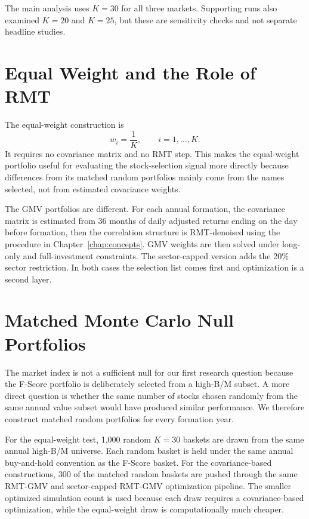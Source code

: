 \documentclass[11pt,a4paper]{report}
\numberwithin{figure}{chapter}
\numberwithin{table}{chapter}
\numberwithin{equation}{chapter}
\begin{document}
The main analysis uses $K=30$ for all three markets. Supporting runs also examined $K=20$ and $K=25$, but these are sensitivity checks and not separate headline studies.

\section{Equal Weight and the Role of RMT}

The equal-weight construction is
\begin{equation}
w_i = \frac{1}{K}, \qquad i=1,\ldots,K.
\end{equation}
It requires no covariance matrix and no RMT step. This makes the equal-weight portfolio useful for evaluating the stock-selection signal more directly because differences from its matched random portfolios mainly come from the names selected, not from estimated covariance weights.

The GMV portfolios are different. For each annual formation, the covariance matrix is estimated from 36 months of daily adjusted returns ending on the day before formation, then the correlation structure is RMT-denoised using the procedure in Chapter~\ref{chap:concepts}. GMV weights are then solved under long-only and full-investment constraints. The sector-capped version adds the 20\% sector restriction. In both cases the selection list comes first and optimization is a second layer.

\section{Matched Monte Carlo Null Portfolios}
\label{sec:monte_carlo}

The market index is not a sufficient null for our first research question because the F-Score portfolio is deliberately selected from a high-B/M subset. A more direct question is whether the same number of stocks chosen randomly from the same annual value subset would have produced similar performance. We therefore construct matched random portfolios for every formation year.

For the equal-weight test, 1,000 random $K=30$ baskets are drawn from the same annual high-B/M universe. Each random basket is held under the same annual buy-and-hold convention as the F-Score basket. For the covariance-based constructions, 300 of the matched random baskets are pushed through the same RMT-GMV and sector-capped RMT-GMV optimization pipeline. The smaller optimized simulation count is used because each draw requires a covariance-based optimization, while the equal-weight draw is computationally much cheaper.
\end{document}
